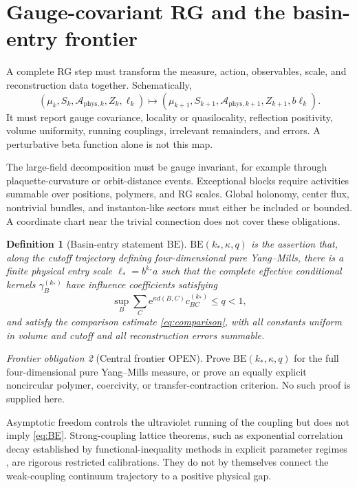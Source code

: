 \documentclass[11pt]{article}
\newcommand{\Ostatus}{\textcolor{open}{\textsf{OPEN}}}
\newcommand{\e}{\mathrm e}
\newtheorem{definition}{Definition}[section]
\theoremstyle{remark}
\newtheorem{obligation}[definition]{Frontier obligation}
\begin{document}
\section{Gauge-covariant RG and the basin-entry frontier}

A complete RG step must transform the measure, action, observables, scale, and
reconstruction data together.  Schematically,
\[
 (\mu_k,S_k,\mathcal A_{\mathrm{phys},k},Z_k,\ell_k)
 \longmapsto
 (\mu_{k+1},S_{k+1},\mathcal A_{\mathrm{phys},k+1},Z_{k+1},b\ell_k).
\]
It must report gauge covariance, locality or quasilocality, reflection
positivity, volume uniformity, running couplings, irrelevant remainders, and
errors.  A perturbative beta function alone is not this map.

The large-field decomposition must be gauge invariant, for example through
plaquette-curvature or orbit-distance events.  Exceptional blocks require
activities summable over positions, polymers, and RG scales.  Global holonomy,
center flux, nontrivial bundles, and instanton-like sectors must either be
included or bounded.  A coordinate chart near the trivial connection does not
cover these obligations.

\begin{definition}[Basin-entry statement $\mathrm{BE}$]
$\mathrm{BE}(k_*,\kappa,q)$ is the assertion that, along the cutoff trajectory
defining four-dimensional pure Yang--Mills, there is a finite physical entry
scale $\ell_*=b^{k_*}a$ such that the complete effective conditional kernels
$\gamma_B^{(k_*)}$ have influence coefficients satisfying
\begin{equation}\label{eq:BE}
 \sup_B\sum_C \e^{\kappa d(B,C)}c_{BC}^{(k_*)}\le q<1,
\end{equation}
and satisfy the comparison estimate \eqref{eq:comparison}, with all constants
uniform in volume and cutoff and all reconstruction errors summable.
\end{definition}

\begin{obligation}[Central frontier \Ostatus]\label{obl:BE}
Prove $\mathrm{BE}(k_*,\kappa,q)$ for the full four-dimensional pure
Yang--Mills measure, or prove an equally explicit noncircular polymer,
coercivity, or transfer-contraction criterion.  No such proof is supplied here.
\end{obligation}

Asymptotic freedom controls the ultraviolet running of the coupling but does
not imply \eqref{eq:BE}.  Strong-coupling lattice theorems, such as exponential
correlation decay established by functional-inequality methods in explicit
parameter regimes \cite{SZZ,Nissim}, are rigorous restricted calibrations.
They do not by themselves connect the weak-coupling continuum trajectory to a
positive physical gap.
\end{document}
